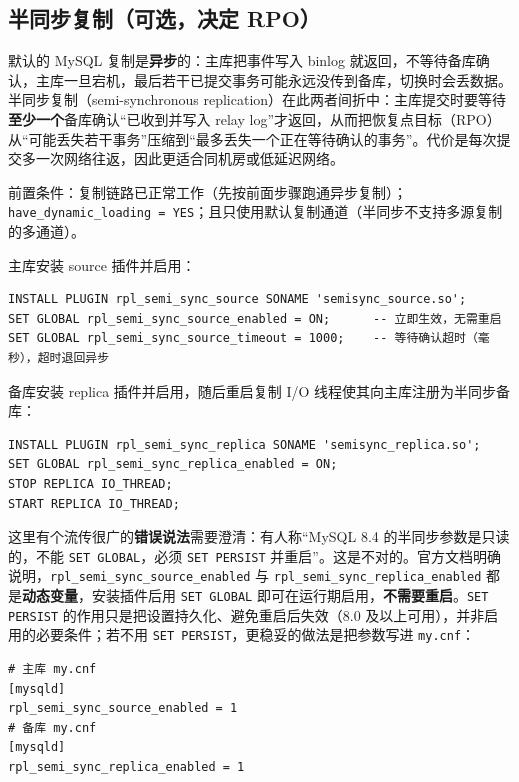 \documentclass[12pt,UTF8]{ctexbook}
\begin{document}
\subsection{半同步复制（可选，决定 RPO）}

默认的 MySQL 复制是\textbf{异步}的：主库把事件写入 binlog 就返回，不等待备库确认，主库一旦宕机，最后若干已提交事务可能永远没传到备库，切换时会丢数据。半同步复制（semi-synchronous replication）在此两者间折中：主库提交时要等待\textbf{至少一个}备库确认“已收到并写入 relay log”才返回，从而把恢复点目标（RPO）从“可能丢失若干事务”压缩到“最多丢失一个正在等待确认的事务”。代价是每次提交多一次网络往返，因此更适合同机房或低延迟网络。

前置条件：复制链路已正常工作（先按前面步骤跑通异步复制）；\texttt{have\_dynamic\_loading = YES}；且只使用默认复制通道（半同步不支持多源复制的多通道）。

主库安装 source 插件并启用：

\begin{lstlisting}
INSTALL PLUGIN rpl_semi_sync_source SONAME 'semisync_source.so';
SET GLOBAL rpl_semi_sync_source_enabled = ON;      -- 立即生效，无需重启
SET GLOBAL rpl_semi_sync_source_timeout = 1000;    -- 等待确认超时（毫秒），超时退回异步
\end{lstlisting}

备库安装 replica 插件并启用，随后重启复制 I/O 线程使其向主库注册为半同步备库：

\begin{lstlisting}
INSTALL PLUGIN rpl_semi_sync_replica SONAME 'semisync_replica.so';
SET GLOBAL rpl_semi_sync_replica_enabled = ON;
STOP REPLICA IO_THREAD;
START REPLICA IO_THREAD;
\end{lstlisting}

这里有个流传很广的\textbf{错误说法}需要澄清：有人称“MySQL 8.4 的半同步参数是只读的，不能 \texttt{SET GLOBAL}，必须 \texttt{SET PERSIST} 并重启”。这是不对的。官方文档明确说明，\texttt{rpl\_semi\_sync\_source\_enabled} 与 \texttt{rpl\_semi\_sync\_replica\_enabled} 都是\textbf{动态变量}，安装插件后用 \texttt{SET GLOBAL} 即可在运行期启用，\textbf{不需要重启}。\texttt{SET PERSIST} 的作用只是把设置持久化、避免重启后失效（8.0 及以上可用），并非启用的必要条件；若不用 \texttt{SET PERSIST}，更稳妥的做法是把参数写进 \texttt{my.cnf}：

\begin{lstlisting}
# 主库 my.cnf
[mysqld]
rpl_semi_sync_source_enabled = 1
# 备库 my.cnf
[mysqld]
rpl_semi_sync_replica_enabled = 1
\end{lstlisting}
\end{document}
